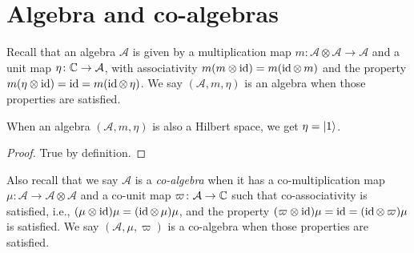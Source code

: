 \chapter{Algebra and co-algebras}

 Recall that an algebra $\mathcal{A}$ is given by a multiplication map $m\colon \mathcal{A}\otimes\mathcal{A}\to\mathcal{A}$ and a unit map $\eta\colon \mathbb{C}\to\mathcal{A}$, with associativity $m(m\otimes\operatorname{id})=m(\operatorname{id}\otimes\,m)$ and the property $m(\eta\otimes\operatorname{id})=\operatorname{id}=m(\operatorname{id}\otimes\,\eta)$. We say $(\mathcal{A},m,\eta)$ is an algebra when those properties are satisfied.

 \begin{corollary}\leanok
  When an algebra $(\mathcal{A},m,\eta)$ is also a Hilbert space, we get $\eta=\left\lvert1\right\rangle$.
 \end{corollary}
 \begin{proof}\leanok
  True by definition.
 \end{proof}

 Also recall that we say $\mathcal{A}$ is a \textit{co-algebra} when it has a co-multiplication map $\mu\colon\mathcal{A}\to\mathcal{A}\otimes\mathcal{A}$ and a co-unit map $\varpi\colon\mathcal{A}\to\mathbb{C}$ such that co-associativity is satisfied, i.e., $(\mu\otimes\operatorname{id})\mu=(\operatorname{id}\otimes\,\mu)\mu$, and the property $(\varpi\otimes\operatorname{id})\mu=\operatorname{id}=(\operatorname{id}\otimes\,\varpi)\mu$ is satisfied.
 We say $(\mathcal{A},\mu,\varpi)$ is a co-algebra when those properties are satisfied.

